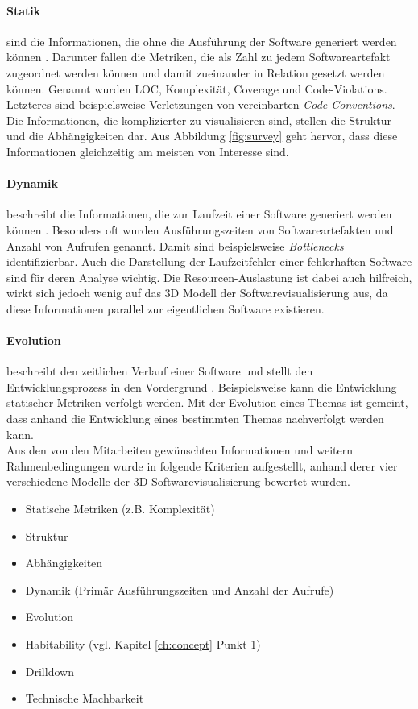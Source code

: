 \paragraph{Statik} sind die Informationen, die ohne die Ausführung der Software generiert werden können \cite{diehl2007software}. Darunter fallen die Metriken, die als Zahl zu jedem Softwareartefakt zugeordnet werden können und damit zueinander in Relation gesetzt werden können. Genannt wurden LOC, Komplexität, Coverage und Code-Violations. Letzteres sind beispielsweise Verletzungen von vereinbarten \emph{Code-Conventions}. Die Informationen, die komplizierter zu visualisieren sind, stellen die Struktur und die Abhängigkeiten dar. Aus Abbildung \ref{fig:survey} geht hervor, dass diese Informationen gleichzeitig am meisten von Interesse sind.

\paragraph{Dynamik} beschreibt die Informationen, die zur Laufzeit einer Software generiert werden können \cite{diehl2007software}. Besonders oft wurden Ausführungszeiten von Softwareartefakten und Anzahl von Aufrufen genannt. Damit sind beispielsweise \emph{Bottlenecks} identifizierbar. Auch die Darstellung der Laufzeitfehler einer fehlerhaften Software sind für deren Analyse wichtig. Die Resourcen-Auslastung ist dabei auch hilfreich, wirkt sich jedoch wenig auf das 3D Modell der Softwarevisualisierung aus, da diese Informationen parallel zur eigentlichen Software existieren.

\paragraph{Evolution} beschreibt den zeitlichen Verlauf einer Software und stellt den Entwicklungsprozess in den Vordergrund \cite{diehl2007software}. Beispielsweise kann die Entwicklung statischer Metriken verfolgt werden. Mit der Evolution eines Themas ist gemeint, dass anhand die Entwicklung eines bestimmten Themas nachverfolgt werden kann.\\

Aus den von den Mitarbeiten gewünschten Informationen und weitern Rahmenbedingungen wurde in \cite{puetz2017softwarevisualisierung} folgende Kriterien aufgestellt, anhand derer vier verschiedene Modelle der 3D Softwarevisualisierung bewertet wurden.

\begin{itemize}
  \item Statische Metriken (z.B. Komplexität)
  \item Struktur
  \item Abhängigkeiten
  \item Dynamik (Primär Ausführungszeiten und Anzahl der Aufrufe)
  \item Evolution
  \item Habitability (vgl. Kapitel \ref{ch:concept} Punkt 1)
  \item Drilldown
  \item Technische Machbarkeit
\end{itemize}

